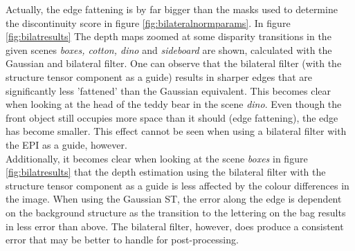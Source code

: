 \documentclass  [
  paper    = a4,
  BCOR     = 10mm,
  twoside,
  fontsize = 12pt,
  fleqn,
  toc      = bibnumbered,
  toc      = listofnumbered,
  numbers  = noendperiod,
  headings = normal,
  listof   = leveldown,
  version  = 3.03
]                                       {scrreprt}
\begin{document}
 Actually, the edge fattening is by far bigger than the masks used to determine the discontinuity score in figure \ref{fig:bilateralnormparams}. In figure \ref{fig:bilatresults} The depth maps zoomed at some disparity transitions in the given scenes \textit{boxes, cotton, dino} and \textit{sideboard} are shown, calculated with the Gaussian and bilateral filter. One can observe that the bilateral filter (with the structure tensor component as a guide) results in sharper edges that are significantly less 'fattened' than the Gaussian equivalent. This becomes clear when looking at the head of the teddy bear in the scene \textit{dino}. Even though the front object still occupies more space than it should (edge fattening), the edge has become smaller. This effect cannot be seen when using a bilateral filter with the EPI as a guide, however.\\
 Additionally, it becomes clear when looking at the scene \textit{boxes} in figure \ref{fig:bilatresults} that the depth estimation using the bilateral filter with the structure tensor component as a guide is less affected by the colour differences in the image. When using the Gaussian ST, the error along the edge is dependent on the background structure as the transition to the lettering on the bag results in less error than above. The bilateral filter, however, does produce a consistent error that may be better to handle for post-processing.
\end{document}
